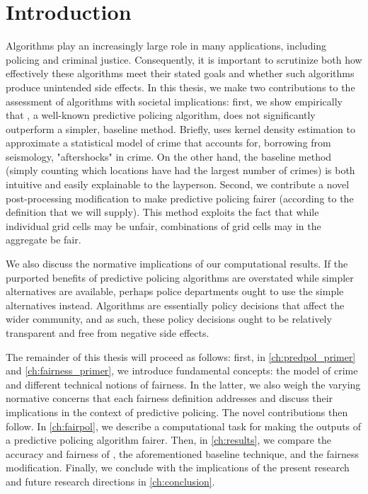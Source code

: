 \chapter{Introduction}\label{ch:introduction}

Algorithms play an increasingly large role in many applications, including policing and criminal justice. Consequently, it is important to scrutinize both how effectively these algorithms meet their stated goals and whether such algorithms produce unintended side effects. In this thesis, we make two contributions to the assessment of algorithms with societal implications: first, we show empirically that \pp, a well-known predictive policing algorithm, does not significantly outperform a simpler, baseline method. Briefly, \pp uses kernel density estimation to approximate a statistical model of crime that accounts for, borrowing from seismology, "aftershocks" in crime. On the other hand, the baseline method (simply counting which locations have had the largest number of crimes) is both intuitive and easily explainable to the layperson. Second, we contribute a novel post-processing modification to make predictive policing fairer (according to the definition that we will supply). This method exploits the fact that while individual grid cells may be unfair, combinations of grid cells may in the aggregate be fair.

We also discuss the normative implications of our computational results. If the purported benefits of predictive policing algorithms are overstated while simpler alternatives are available, perhaps police departments ought to use the simple alternatives instead. Algorithms are essentially policy decisions that affect the wider community, and as such, these policy decisions ought to be relatively transparent and free from negative side effects.

The remainder of this thesis will proceed as follows: first, in \autoref{ch:predpol_primer} and \autoref{ch:fairness_primer}, we introduce fundamental concepts: the \pp model of crime and different technical notions of fairness. In the latter, we also weigh the varying normative concerns that each fairness definition addresses and discuss their implications in the context of predictive policing. The novel contributions then follow. In \autoref{ch:fairpol}, we describe a computational task for making the outputs of a predictive policing algorithm fairer. Then, in \autoref{ch:results}, we compare the accuracy and fairness of \pp, the aforementioned baseline technique, and the fairness modification. Finally, we conclude with the implications of the present research and future research directions in \autoref{ch:conclusion}.

